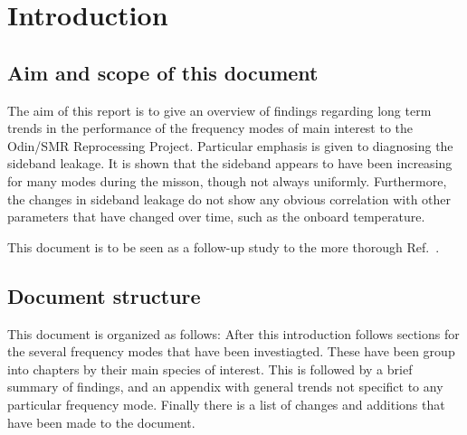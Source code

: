 \chapter{Introduction}
\label{chapter:introduction}


\setcounter{page}{1}


\section{Aim and scope of this document}
\label{sec:aim}
The aim of this report is to give an overview of findings regarding long term
trends in the performance of the frequency modes of main interest to the
Odin/SMR Reprocessing Project. Particular emphasis is given to diagnosing the
sideband leakage. It is shown that the sideband appears to have been
increasing for many modes during the misson, though not always uniformly.
Furthermore, the changes in sideband leakage do not show any obvious
correlation with other parameters that have changed over time, such as the
onboard temperature.

This document is to be seen as a follow-up study to the more thorough
Ref.~\cite{postlaunch:2006}.

\section{Document structure}

This document is organized as follows:
After this introduction follows sections for the several frequency modes that
have been investiagted. These have been group into chapters by their main
species of interest. This is followed by a brief summary of findings, and an
appendix with general trends not specifict to any particular frequency mode.
Finally there is a list of changes and additions that have been made to the
document.
